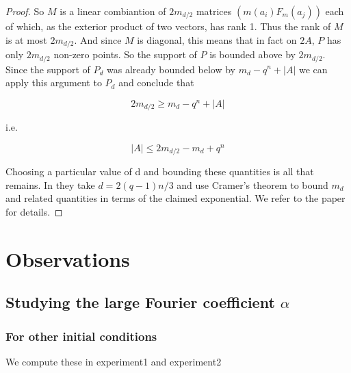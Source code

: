 \documentclass{article}
\theoremstyle{definition}
\theoremstyle{remark}
\numberwithin{equation}{section}
\begin{document}
\begin{proof}
  So $M$ is a linear combiantion of $2 m_{d/2}$ matrices $(m(a_i)
  F_m(a_j))$ each of which, as the exterior product of two vectors, has
  rank 1.  Thus the rank of $M$ is at most $2 m_{d/2}$.  And since $M$ is
  diagonal, this means that in fact on $2A$, $P$ has only $2 m_{d/2}$ non-zero
  points.  So the support of $P$ is bounded above by $2 m_{d/2}$.  Since the
  support of $P_d$ was already bounded below by $m_d - q^n + |A|$ we can
  apply this argument to $P_d$ and conclude that
  
  \[2 m_{d/2} \geq m_d - q^n + |A|\]
  
  i.e.
  
  \[|A| \leq 2 m_{d/2} - m_d + q^n\]

  Choosing a particular value of d and bounding these quantities is
  all that remains.  In \cite{capset_ellenberg} they take
  $d = 2(q-1)n/3$ and use Cramer's theorem to bound $m_d$ and related
  quantities in terms of the claimed exponential.  We refer to the
  paper for details.
\end{proof}
  

\section{Observations}

\subsection{Studying the large Fourier coefficient $\alpha$}

\subsubsection{For other initial conditions}

We compute these in experiment1 and experiment2
\end{document}
